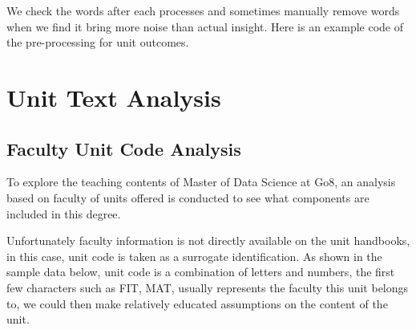 \documentclass[
  letterpaper,
]{report}
\newenvironment{Shaded}{\begin{snugshade}}{\end{snugshade}}
\newcommand{\AttributeTok}[1]{\textcolor[rgb]{0.40,0.45,0.13}{#1}}
\newcommand{\FunctionTok}[1]{\textcolor[rgb]{0.28,0.35,0.67}{#1}}
\newcommand{\NormalTok}[1]{\textcolor[rgb]{0.00,0.23,0.31}{#1}}
\newcommand{\OtherTok}[1]{\textcolor[rgb]{0.00,0.23,0.31}{#1}}
\newcommand{\SpecialCharTok}[1]{\textcolor[rgb]{0.37,0.37,0.37}{#1}}
\newcommand{\StringTok}[1]{\textcolor[rgb]{0.13,0.47,0.30}{#1}}
\begin{document}
We check the words after each processes and sometimes manually remove
words when we find it bring more noise than actual insight. Here is an
example code of the pre-processing for unit outcomes.

\begin{Shaded}
\end{Shaded}

\hypertarget{sec-unit-analysis}{%
\chapter{Unit Text Analysis}\label{sec-unit-analysis}}

\hypertarget{sec-unit-code}{%
\section{Faculty Unit Code Analysis}\label{sec-unit-code}}

To explore the teaching contents of Master of Data Science at Go8, an
analysis based on faculty of units offered is conducted to see what
components are included in this degree.

Unfortunately faculty information is not directly available on the unit
handbooks, in this case, unit code is taken as a surrogate
identification. As shown in the sample data below, unit code is a
combination of letters and numbers, the first few characters such as
FIT, MAT, usually represents the faculty this unit belongs to, we could
then make relatively educated assumptions on the content of the unit.
\end{document}
